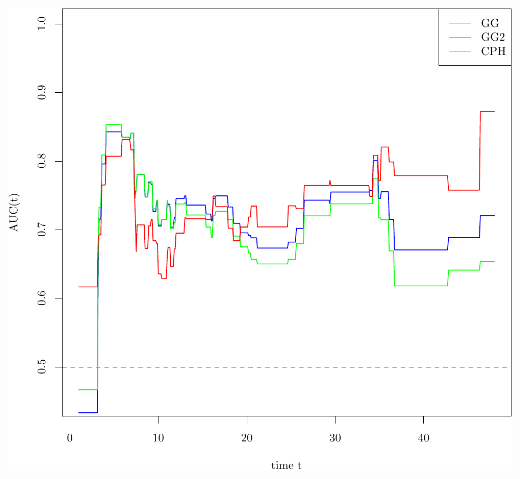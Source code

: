 \documentclass{article}\usepackage[]{graphicx}\usepackage[]{color}
\makeatletter
\def\maxwidth{ %
  \ifdim\Gin@nat@width>\linewidth
    \linewidth
  \else
    \Gin@nat@width
  \fi
}
\newenvironment{knitrout}{}{} %
\makeatother
\begin{document}
\begin{knitrout}
{\centering \includegraphics[width=\maxwidth]{figure/05-model-selection-auc-1} 

}



\end{knitrout}
\end{document}

